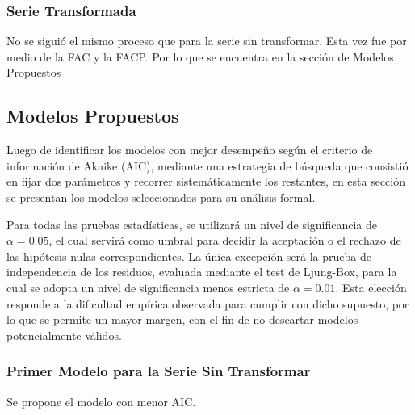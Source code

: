 \documentclass[12pt,letterpaper]{article}   %
\begin{document}
\subsubsection{Serie Transformada}

No se siguió el mismo proceso que para la serie sin transformar. Esta vez fue por medio de la FAC y la FACP. Por lo que se encuentra en la sección de Modelos Propuestos





\newpage
\subsection{Modelos Propuestos}

Luego de identificar los modelos con mejor desempeño según el criterio de información de Akaike (AIC), mediante una estrategia de búsqueda que consistió en fijar dos parámetros y recorrer sistemáticamente los restantes, en esta sección se presentan los modelos seleccionados para su análisis formal.

Para todas las pruebas estadísticas, se utilizará un nivel de significancia de 
$\alpha=0.05$, el cual servirá como umbral para decidir la aceptación o el rechazo de las hipótesis nulas correspondientes. La única excepción será la prueba de independencia de los residuos, evaluada mediante el test de Ljung-Box, para la cual se adopta un nivel de significancia menos estricta de $\alpha=0.01$. Esta elección responde a la dificultad empírica observada para cumplir con dicho supuesto, por lo que se permite un mayor margen, con el fin de no descartar modelos potencialmente válidos.

  \subsubsection{Primer Modelo para la Serie Sin Transformar}
  Se propone el modelo con menor AIC.
  
\end{document}
